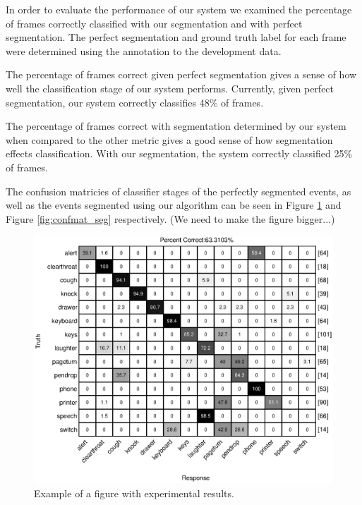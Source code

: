 In order to evaluate the performance of our system we examined the percentage of frames 
correctly classified with our segmentation and with perfect segmentation. The perfect
segmentation and ground truth label for each frame were determined using the annotation
to the development data.

The percentage of frames correct given perfect segmentation gives a sense of how well the
classification stage of our system performs. Currently, given perfect segmentation,
our system correctly classifies 48\% of frames. 

The percentage of frames correct with segmentation determined by our system when compared to the other metric
gives a good sense of how segmentation effects classification. With our segmentation, the 
system correctly classified 25\% of frames.

The confusion matricies of classifier stages of the perfectly segmented events, as well as the events segmented using our algorithm can be seen in Figure \ref{fig:confmat_perfect} and Figure \ref{fig:confmat_seg} respectively. (We need to make the figure bigger...)

\begin{figure}[h]
  \centering
  \centerline{\includegraphics[width=\columnwidth]{confmatrix1}}
  \caption{Example of a figure with experimental results.}
  \label{fig:confmat_perfect}
\end{figure}

